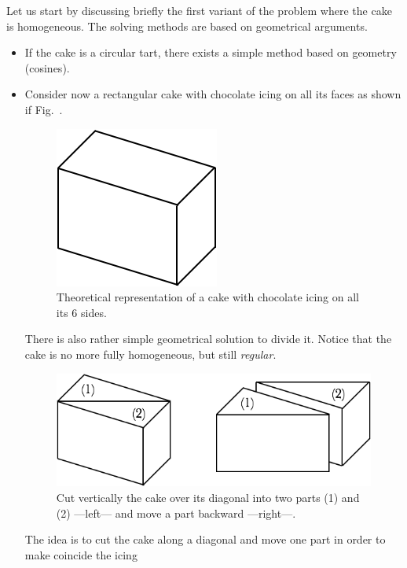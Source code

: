 Let us start by discussing briefly the first variant of the problem where the cake is homogeneous. 
The solving methods are based on geometrical arguments. 
\begin{itemize}
\item If the cake is a circular tart, there exists a simple method based on geometry (cosines).
\item Consider now a rectangular cake with chocolate icing on all its faces as shown if Fig.~\label{Fig:cakeHomogeneous1}.
\begin{figure}[htb]
\begin{center}
        \includegraphics[scale=0.4]{FiguresMaths/CakeHomogeneous1}
        \caption{Theoretical representation of a cake with chocolate icing on all its 6 sides.}
        \label{Fig:cakeHomogeneous1}
\end{center}
\end{figure}
There is also rather simple geometrical solution to divide it. 
Notice that the cake is no more fully homogeneous, but still \textit{regular}. 
\begin{figure}[htb]
\begin{center}
        \includegraphics[scale=0.4]{FiguresMaths/CakeHomogeneous2}
        \caption{Cut vertically the cake over its diagonal into two parts (1) and (2) ---left--- and move a part backward ---right---.}
        \label{Fig:cakeHomogeneous2}
\end{center}
\end{figure}
The idea is to cut the cake along a diagonal and move one part in order to make coincide the icing

\end{itemize}
